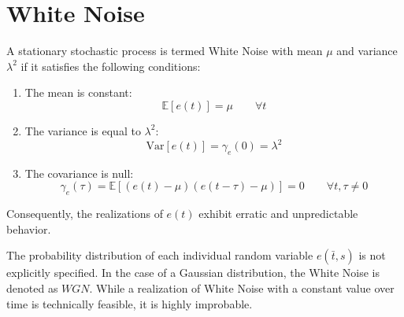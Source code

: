 \section{ White Noise}

\begin{definition}
    A stationary stochastic process is termed White Noise with mean $\mu$ and variance $\lambda^2$ if it satisfies the following conditions:
\end{definition}
\begin{enumerate}
    \item The mean is constant: 
        \[\mathbb{E}\left[e(t)\right]=\mu \qquad \forall t\]
    \item The variance is equal to $\lambda^2$: 
        \[\text{Var}\left[e(t)\right]=\gamma_e(0)=\lambda^2\]
    \item The covariance is null: 
        \[\gamma_e(\tau)=\mathbb{E}\left[ \left(e(t)-\mu\right)\left(e(t-\tau)-\mu\right) \right]=0 \qquad \forall t,\tau \neq 0\] 
\end{enumerate}
Consequently, the realizations of $e(t)$ exhibit erratic and unpredictable behavior.

The probability distribution of each individual random variable $e(\bar{t},s)$ is not explicitly specified.
In the case of a Gaussian distribution, the  White Noise is denoted as $WGN$.
While a realization of  White Noise with a constant value over time is technically feasible, it is highly improbable.